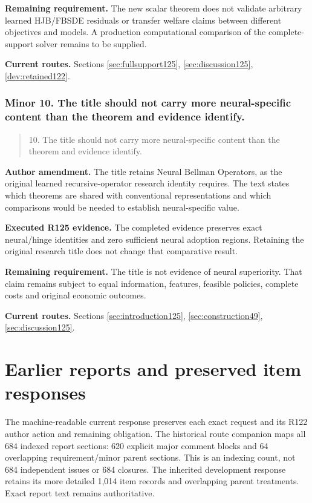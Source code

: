 \noindent\textbf{Remaining requirement.} The new scalar theorem does not validate arbitrary learned HJB/FBSDE residuals or transfer welfare claims between different objectives and models. A production computational comparison of the complete-support solver remains to be supplied.

\noindent\textbf{Current routes.} Sections \ref{sec:fullsupport125}, \ref{sec:discussion125}, \ref{dev:retained122}.

\subsubsection{Minor 10. The title should not carry more neural-specific content than the theorem and evidence identify.}

\begin{quote}\small
10. The title should not carry more neural-specific content than the theorem and evidence identify.
\end{quote}

\noindent\textbf{Author amendment.} The title retains Neural Bellman Operators, as the original learned recursive-operator research identity requires. The text states which theorems are shared with conventional representations and which comparisons would be needed to establish neural-specific value.

\noindent\textbf{Executed R125 evidence.} The completed evidence preserves exact neural/hinge identities and zero sufficient neural adoption regions. Retaining the original research title does not change that comparative result.

\noindent\textbf{Remaining requirement.} The title is not evidence of neural superiority. That claim remains subject to equal information, features, feasible policies, complete costs and original economic outcomes.

\noindent\textbf{Current routes.} Sections \ref{sec:introduction125}, \ref{sec:construction49}, \ref{sec:discussion125}.

\section{Earlier reports and preserved item responses}

The machine-readable current response preserves each exact request and its
R122 author action and remaining obligation. The historical route companion
maps all 684 indexed report sections: 620 explicit major comment blocks and
64 overlapping requirement/minor parent sections. This is an indexing
count, not 684 independent issues or 684 closures. The inherited development
response retains its more detailed 1,014 item records and overlapping parent
treatments. Exact report text remains authoritative.

